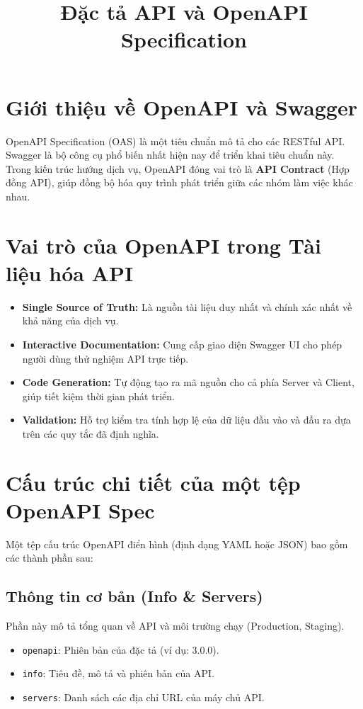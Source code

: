 \documentclass{article}
\title{\textbf{Đặc tả API và OpenAPI Specification}}
\date{}
\begin{document}
\maketitle

\section{Giới thiệu về OpenAPI và Swagger}
OpenAPI Specification (OAS) là một tiêu chuẩn mô tả cho các RESTful API. Swagger là bộ công cụ phổ biến nhất hiện nay để triển khai tiêu chuẩn này. Trong kiến trúc hướng dịch vụ, OpenAPI đóng vai trò là \textbf{API Contract} (Hợp đồng API), giúp đồng bộ hóa quy trình phát triển giữa các nhóm làm việc khác nhau.

\section{Vai trò của OpenAPI trong Tài liệu hóa API}
\begin{itemize}
    \item \textbf{Single Source of Truth:} Là nguồn tài liệu duy nhất và chính xác nhất về khả năng của dịch vụ.
    \item \textbf{Interactive Documentation:} Cung cấp giao diện Swagger UI cho phép người dùng thử nghiệm API trực tiếp.
    \item \textbf{Code Generation:} Tự động tạo ra mã nguồn cho cả phía Server và Client, giúp tiết kiệm thời gian phát triển.
    \item \textbf{Validation:} Hỗ trợ kiểm tra tính hợp lệ của dữ liệu đầu vào và đầu ra dựa trên các quy tắc đã định nghĩa.
\end{itemize}

\section{Cấu trúc chi tiết của một tệp OpenAPI Spec}
Một tệp cấu trúc OpenAPI điển hình (định dạng YAML hoặc JSON) bao gồm các thành phần sau:

\subsection{Thông tin cơ bản (Info \& Servers)}
Phần này mô tả tổng quan về API và môi trường chạy (Production, Staging).
\begin{itemize}
    \item \texttt{openapi}: Phiên bản của đặc tả (ví dụ: 3.0.0).
    \item \texttt{info}: Tiêu đề, mô tả và phiên bản của API.
    \item \texttt{servers}: Danh sách các địa chỉ URL của máy chủ API.
\end{itemize}
\end{document}
